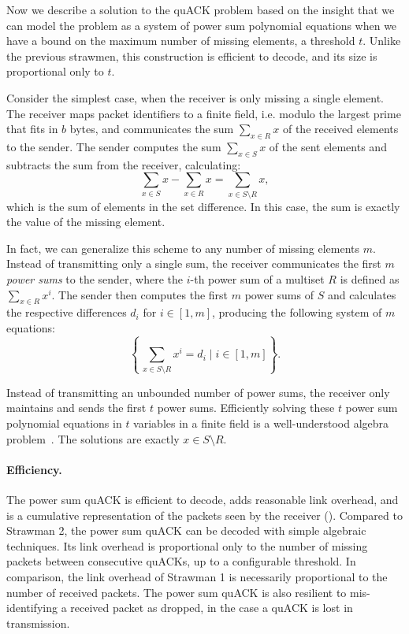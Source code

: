 Now we describe a solution to the quACK problem based on the insight
that we can model the problem as a system of power sum polynomial equations
when we have a bound on the maximum number of missing elements, a threshold $t$.
Unlike the previous strawmen, this construction is efficient to decode, and
its size is proportional only to $t$.

Consider the simplest case, when the receiver is only missing a single element.
The receiver maps packet identifiers to a finite field,
i.e. modulo the largest prime that fits in $b$ bytes,
 and communicates the sum $\sum_{x \in R} x$ of the received
elements to
the sender. The sender computes the sum $\sum_{x \in S} x$ of the sent elements
and subtracts the sum from the receiver, calculating:
\[
    \sum_{x \in S} x - \sum_{x \in R} x = \sum_{x \in S\setminus R} x,
\]
which is the sum of elements in the set difference. In this case, the sum is
exactly the value of the missing element.

In fact, we can generalize this scheme to any number of missing elements $m$.
Instead of transmitting only a single sum, the receiver communicates
the first $m$ \emph{power sums} to the sender, where the $i$-th power sum of a
multiset $R$ is defined as $\sum_{x \in R} x^i$.
The sender then computes the first $m$ power sums of $S$ and calculates the
respective differences $d_i$ for $i \in [1,m]$, producing the following
system of $m$ equations:
\vspace{-0.2cm}
\[
    \left\{\, \sum_{x \in S\setminus R} x^i = d_i \mid i \in [1,m] \right\}.
\]
\vspace{-0.4cm}

Instead of transmitting an unbounded number of power sums, the receiver only
maintains and sends the first $t$ power sums. Efficiently solving these $t$
power sum polynomial equations in $t$ variables in a finite field is a
well-understood algebra problem~\cite{eppstein2011straggler}. The solutions are
exactly $x \in S \setminus R$.

\paragraph{Efficiency.}
The power sum quACK is efficient to decode, adds reasonable link overhead,
and is a cumulative representation of the packets seen by the receiver
().
Compared to Strawman 2, the power sum quACK can be decoded with simple
algebraic techniques.
Its link overhead is proportional only to the number of
missing packets between consecutive quACKs, up to a configurable threshold. In
comparison, the link overhead of Strawman 1 is necessarily proportional to the
number of received packets.
The power sum quACK is also resilient to mis-identifying a received packet as
dropped, in the case a quACK is lost in transmission.

